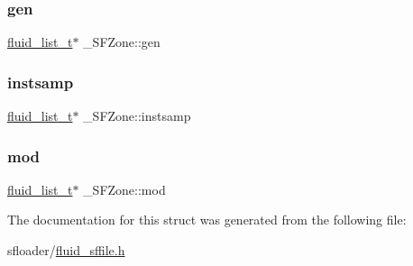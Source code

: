 \subsubsection{\texorpdfstring{gen}{gen}}
{\footnotesize\ttfamily \hyperlink{fluid__list_8h_a3ef7535d4290862c0af118569223bd89}{fluid\+\_\+list\+\_\+t}$\ast$ \+\_\+\+S\+F\+Zone\+::gen}

\mbox{\label{struct__SFZone_af8e26b09d32ed4df73ed980737f808fd}} 
\subsubsection{\texorpdfstring{instsamp}{instsamp}}
{\footnotesize\ttfamily \hyperlink{fluid__list_8h_a3ef7535d4290862c0af118569223bd89}{fluid\+\_\+list\+\_\+t}$\ast$ \+\_\+\+S\+F\+Zone\+::instsamp}

\mbox{\label{struct__SFZone_ae061f0cdd6efe03bb14fa35cc338cf17}} 
\subsubsection{\texorpdfstring{mod}{mod}}
{\footnotesize\ttfamily \hyperlink{fluid__list_8h_a3ef7535d4290862c0af118569223bd89}{fluid\+\_\+list\+\_\+t}$\ast$ \+\_\+\+S\+F\+Zone\+::mod}



The documentation for this struct was generated from the following file\+:\begin{DoxyCompactItemize}
\item 
sfloader/\hyperlink{fluid__sffile_8h}{fluid\+\_\+sffile.\+h}\end{DoxyCompactItemize}
